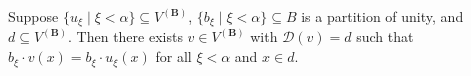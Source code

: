 Suppose $\{u_\xi \mid \xi < \alpha\} \subseteq V^{(\mathbf{B})}$, $\{b_\xi \mid \xi < \alpha\} \subseteq B$ is a partition of unity, and $d \subseteq V^{(\mathbf{B})}$. Then there exists $v \in V^{(\mathbf{B})}$ with $\mathcal{D}(v) = d$ such that $b_\xi \cdot v(x) = b_\xi \cdot u_\xi(x)$ for all $\xi < \alpha$ and $x \in d$.
